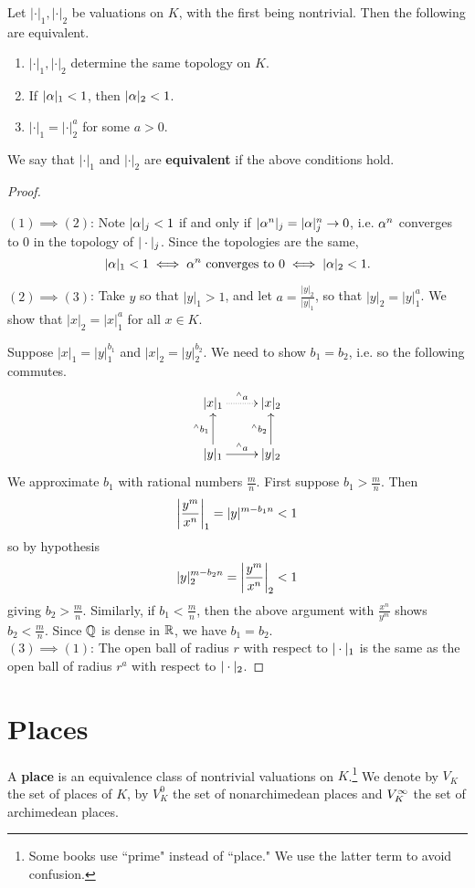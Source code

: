 \begin{pr}
Let $|\cdot|_1,|\cdot|_2$ be valuations on $K$, with the first being nontrivial. Then the following are equivalent.
\begin{enumerate}
\item
$|\cdot|_1,|\cdot|_2$ determine the same topology on $K$.
\item
If $|\alpha|_1<1$, then $|\alpha|_2<1$.
\item $|\cdot|_1=|\cdot |_2^a$ for some $a>0$.
\end{enumerate}
We say that $|\cdot|_1$ and $|\cdot|_2$ are \textbf{equivalent} if the above conditions hold.
\end{pr}
\begin{proof}$\,$

\noindent \underline{$(1)\implies (2)$}: 
Note $|\alpha|_j<1$ if and only if $|\alpha^n|_j=|\alpha|_j^n\to 0$, i.e. $\alpha^n$ converges to 0 in the topology of $|\cdot|_j$. Since the topologies are the same,
\[
|\alpha|_1<1\iff \alpha^n\text{ converges to }0\iff |\alpha|_2<1.
\]

\noindent \underline{$(2)\implies (3)$}:
Take $y$ so that $|y|_1>1$, and let $a=\frac{|y|_2}{|y|_1}$, so that $|y|_2=|y|_1^a$. We show that $|x|_2=|x|_1^a$ for all $x\in K$.

Suppose $|x|_1=|y|_1^{b_1}$ and $|x|_2=|y|_2^{b_2}$. We need to show $b_1=b_2$, i.e. so the following commutes.
\[
\xymatrix{
|x|_1\ar@{.>}[r]^{{}^{\wedge} a} & |x|_2\\
|y|_1\ar[u]^{{}^{\wedge}b_1} \ar[r]^{{}^{\wedge}a} & |y|_2\ar[u]^{{}^{\wedge}b_2}
}
\]
We approximate $b_1$ with rational numbers $\frac mn$. First suppose $b_1>\frac mn$. Then
\[
\left| {\frac{y^m}{x^{n}}} \right|_1=|y|^{m-b_1n}<1
\]
so by hypothesis 
\[
|y|_2^{m-b_2n}=\left| {\frac{y^m}{x^{n}}} \right|_2<1
\]
giving $b_2>\frac mn$. Similarly, if $b_1<\frac mn$, then the above argument with $\frac{x^n}{y^m}$ shows $b_2<\frac mn$. Since $\mathbb{Q}$ is dense in $\mathbb{R}$, we have $b_1=b_2$.\\

\noindent\underline{$(3)\implies (1)$}: The open ball of radius $r$ with respect to $|\cdot|_1$ is the same as the open ball of radius $r^a$ with respect to $|\cdot|_2$.
\end{proof}

\section{Places}
\begin{df}
A \textbf{place} is an equivalence class of nontrivial valuations on $K$.\footnote{Some books use ``prime" instead of ``place." We use the latter term to avoid confusion.} We denote by $V_K$ the set of places of $K$, by $V_K^0$ the set of nonarchimedean places and $V_K^{\infty}$ the set of archimedean places.
\end{df}


